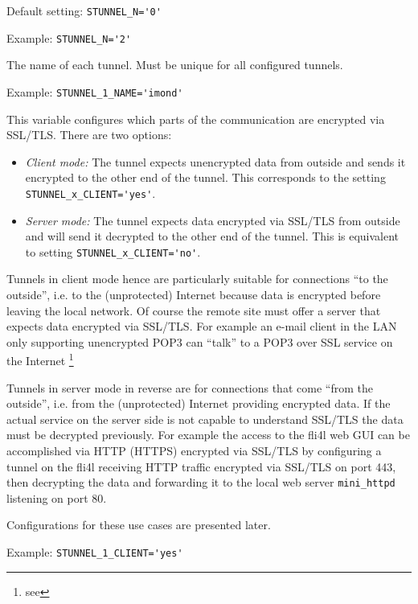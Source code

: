 \begin{description}
Default setting: \verb+STUNNEL_N='0'+

Example: \verb+STUNNEL_N='2'+


The name of each tunnel. Must be unique for all configured tunnels.

Example: \verb+STUNNEL_1_NAME='imond'+


This variable configures which parts of the communication are encrypted via
SSL/TLS. There are two options:

\begin{itemize}
\item \emph{Client mode:} The tunnel expects unencrypted data from outside
and sends it encrypted to the other end of the tunnel. This corresponds to
the setting\\
\verb+STUNNEL_x_CLIENT='yes'+.
\item\emph{Server mode:} The tunnel expects data encrypted via SSL/TLS from
outside and will send it decrypted to the other end of the tunnel. This is
equivalent to setting \verb+STUNNEL_x_CLIENT='no'+.
\end{itemize}

Tunnels in client mode hence are particularly suitable for connections ``to
the outside'', i.e. to the (unprotected) Internet because data is encrypted
before leaving the local network. Of course the remote site must offer a server
that expects data encrypted via SSL/TLS. For example an e-mail client in the LAN
only supporting unencrypted POP3 can ``talk'' to a POP3 over SSL service on the
Internet \footnote{see }

Tunnels in server mode in reverse are for connections that come ``from the
outside'', i.e. from the (unprotected) Internet providing encrypted data.
If the actual service on the server side is not capable to understand
SSL/TLS the data must be decrypted previously. For example the access to
the fli4l web GUI can be accomplished via HTTP (HTTPS) encrypted via SSL/TLS
by configuring a tunnel on the fli4l receiving HTTP traffic encrypted via
SSL/TLS on port 443, then decrypting the data and forwarding it to the local
web server \texttt{mini\_httpd} listening on port 80.

Configurations for these use cases are presented later.

Example: \verb+STUNNEL_1_CLIENT='yes'+


\end{description}
